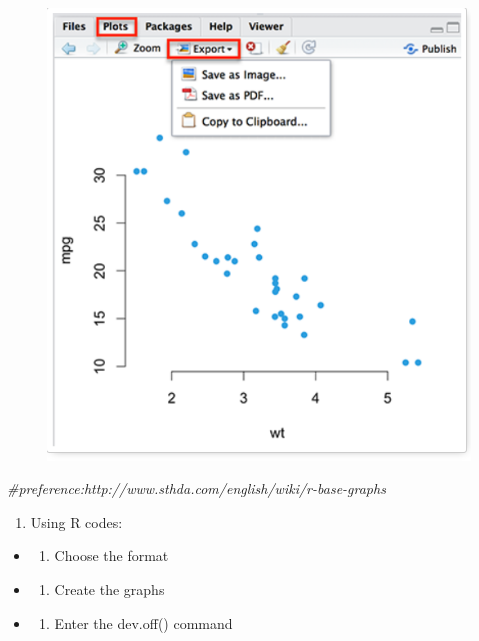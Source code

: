 \documentclass[]{book}
\newenvironment{Shaded}{\begin{snugshade}}{\end{snugshade}}
\newcommand{\CommentTok}[1]{\textcolor[rgb]{0.56,0.35,0.01}{\textit{#1}}}
\providecommand{\tightlist}{%
  \setlength{\itemsep}{0pt}\setlength{\parskip}{0pt}}
\begin{document}
\begin{figure}
\centering
\includegraphics{1.PNG}
\caption{}
\end{figure}

\begin{Shaded}
\begin{Highlighting}[]
\CommentTok{#preference:http://www.sthda.com/english/wiki/r-base-graphs}
\end{Highlighting}
\end{Shaded}

\begin{enumerate}
\def\labelenumi{\arabic{enumi}.}
\setcounter{enumi}{1}
\tightlist
\item
  Using R codes:
\end{enumerate}

\begin{itemize}
\item
  \begin{enumerate}
  \def\labelenumi{\arabic{enumi}.}
  \tightlist
  \item
    Choose the format
  \end{enumerate}
\item
  \begin{enumerate}
  \def\labelenumi{\arabic{enumi}.}
  \setcounter{enumi}{1}
  \tightlist
  \item
    Create the graphs
  \end{enumerate}
\item
  \begin{enumerate}
  \def\labelenumi{\arabic{enumi}.}
  \setcounter{enumi}{2}
  \tightlist
  \item
    Enter the dev.off() command
  \end{enumerate}
\end{itemize}
\end{document}
